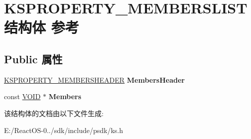 \hypertarget{struct_k_s_p_r_o_p_e_r_t_y___m_e_m_b_e_r_s_l_i_s_t}{}\section{K\+S\+P\+R\+O\+P\+E\+R\+T\+Y\+\_\+\+M\+E\+M\+B\+E\+R\+S\+L\+I\+S\+T结构体 参考}
\label{struct_k_s_p_r_o_p_e_r_t_y___m_e_m_b_e_r_s_l_i_s_t}
\subsection*{Public 属性}
\begin{DoxyCompactItemize}
\item 
\mbox{\label{struct_k_s_p_r_o_p_e_r_t_y___m_e_m_b_e_r_s_l_i_s_t_a4d4c2501ba98a8d416c8145b8706f877}} 
\hyperlink{struct_k_s_p_r_o_p_e_r_t_y___m_e_m_b_e_r_s_h_e_a_d_e_r}{K\+S\+P\+R\+O\+P\+E\+R\+T\+Y\+\_\+\+M\+E\+M\+B\+E\+R\+S\+H\+E\+A\+D\+ER} {\bfseries Members\+Header}
\item 
\mbox{\label{struct_k_s_p_r_o_p_e_r_t_y___m_e_m_b_e_r_s_l_i_s_t_adcd83215cd6a7fc86f69f06536de8bcf}} 
const \hyperlink{interfacevoid}{V\+O\+ID} $\ast$ {\bfseries Members}
\end{DoxyCompactItemize}


该结构体的文档由以下文件生成\+:\begin{DoxyCompactItemize}
\item 
E\+:/\+React\+O\+S-\/0../sdk/include/psdk/ks.\+h\end{DoxyCompactItemize}
